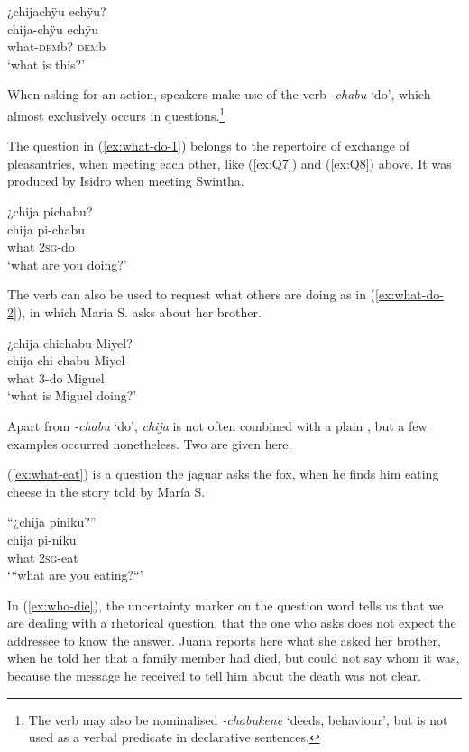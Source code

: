 \ea\label{ex:what-this}
\begingl
\glpreamble ¿chijachÿu echÿu?\\
\gla chija-chÿu echÿu\\
\glb what-\textsc{dem}b? \textsc{dem}b\\
\glft ‘what is this?’
\endgl
\trailingcitation{[jxx-a120516l-a.479]}
\xe
{}

When asking for an action, speakers make use of the verb \textit{-chabu} ‘do’, which almost exclusively occurs in questions.\footnote{The verb may also be nominalised \textit{-chabukene} ‘deeds, behaviour’, but is not used as a verbal predicate in declarative sentences.} 

The question in (\ref{ex:what-do-1}) belongs to the repertoire of exchange of pleasantries, when meeting each other, like (\ref{ex:Q7}) and (\ref{ex:Q8}) above. It was produced by Isidro when meeting Swintha.

\ea\label{ex:what-do-1}
\begingl
\glpreamble ¿chija pichabu?\\
\gla chija pi-chabu\\
\glb what 2\textsc{sg}-do\\
\glft ‘what are you doing?’
\endgl
\trailingcitation{[mdx-c120416ls.005]}
\xe

The verb can also be used to request what others are doing as in (\ref{ex:what-do-2}), in which María S. asks about her brother.

\ea\label{ex:what-do-2}
\begingl
\glpreamble ¿chija chichabu Miyel?\\
\gla chija chi-chabu Miyel\\
\glb what 3-do Miguel\\
\glft ‘what is Miguel doing?’
\endgl
\trailingcitation{[rxx-e120511l.337]}
\xe

Apart from \textit{-chabu} ‘do’, \textit{chija} is not often combined with a plain , but a few examples occurred nonetheless. Two are given here. 

(\ref{ex:what-eat}) is a question the jaguar asks the fox, when he finds him eating cheese in the story told by María S.

\ea\label{ex:what-eat}
\begingl
\glpreamble “¿chija piniku?”\\
\gla chija pi-niku\\
\glb what 2\textsc{sg}-eat\\
\glft ‘“what are you eating?“’
\endgl
\trailingcitation{[rxx-n120511l-1.031]}
\xe

In (\ref{ex:who-die}), the uncertainty marker on the question word tells us that we are dealing with a rhetorical question, that the one who asks does not expect the addressee to know the answer. Juana reports here what she asked her brother, when he told her that a family member had died, but could not say whom it was, because the message he received to tell him about the death was not clear.

